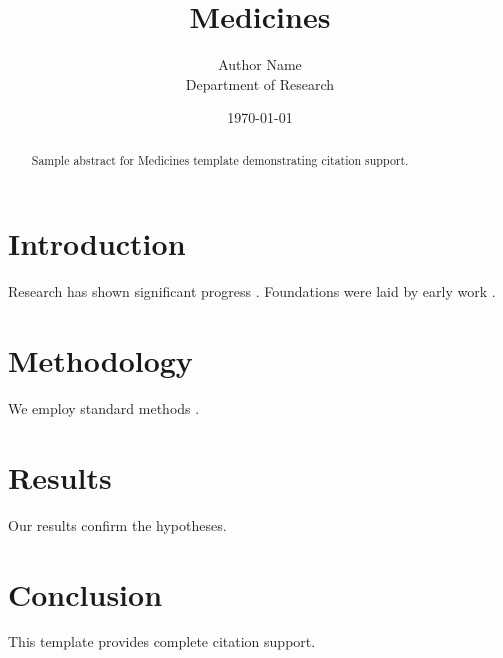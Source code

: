 \documentclass{mdpi}
\title{Medicines}
\author{Author Name \\ \small Department of Research}
\date{\today}
\begin{document}
\maketitle

\begin{abstract}
Sample abstract for Medicines template demonstrating citation support.
\end{abstract}

\section{Introduction}
Research has shown significant progress \citep{einstein1905}. Foundations were laid by early work \citep{turing1950}.

\section{Methodology}
We employ standard methods \citep{knuth1984}.

\section{Results}
Our results confirm the hypotheses.

\section{Conclusion}
This template provides complete citation support.



\end{document}
